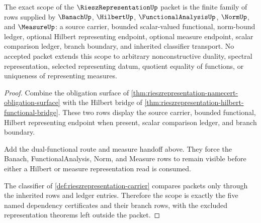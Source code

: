 \begin{theorem}
\label{thm:riesz-representation-banach-hilbert-scope}
The exact scope of the $\RieszRepresentationUp$ packet is the finite family of rows supplied by $\BanachUp$, $\HilbertUp$, $\FunctionalAnalysisUp$, $\NormUp$, and $\MeasureUp$: a source carrier, bounded scalar-valued functional, norm-bound ledger, optional Hilbert representing endpoint, optional measure endpoint, scalar comparison ledger, branch boundary, and inherited classifier transport. No accepted packet extends this scope to arbitrary nonconstructive duality, spectral representation, selected representing datum, quotient equality of functions, or uniqueness of representing measures.
\end{theorem}
\begin{proof}
Combine the obligation surface of \autoref{thm:rieszrepresentation-namecert-obligation-surface} with the Hilbert bridge of \autoref{thm:rieszrepresentation-hilbert-functional-bridge}. These two rows display the source carrier, bounded functional, Hilbert representing endpoint when present, scalar comparison ledger, and branch boundary.

Add the dual-functional route and measure handoff above. They force the Banach, FunctionalAnalysis, Norm, and Measure rows to remain visible before either a Hilbert or measure representation read is consumed.

The classifier of \autoref{def:rieszrepresentation-carrier} compares packets only through the inherited rows and ledger entries. Therefore the scope is exactly the five named dependency certificates and their branch rows, with the excluded representation theorems left outside the packet.
\end{proof}

